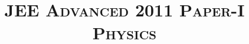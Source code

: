 \documentclass{article}
\title{\textsc{JEE Advanced 2011 Paper-I\\Physics}}
\date{}
\begin{document}
\maketitle
\begin{enumerate}
    
    
    
    
    
    
    
    
    
    
    
    
    
    
    
    
    
    
    
    
\end{enumerate}
\end{document}
